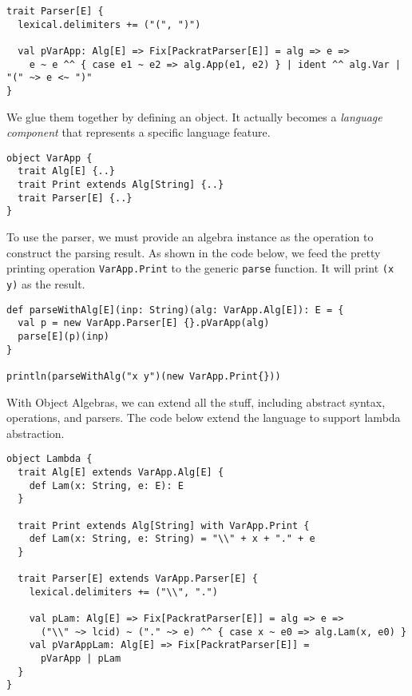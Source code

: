 \begin{lstlisting}
trait Parser[E] {
  lexical.delimiters += ("(", ")")

  val pVarApp: Alg[E] => Fix[PackratParser[E]] = alg => e =>
    e ~ e ^^ { case e1 ~ e2 => alg.App(e1, e2) } | ident ^^ alg.Var | "(" ~> e <~ ")"
}
\end{lstlisting}

We glue them together by defining an object. It actually becomes a \textit{language component} that represents a specific language feature.

\begin{lstlisting}
object VarApp {
  trait Alg[E] {..}
  trait Print extends Alg[String] {..}
  trait Parser[E] {..}
}
\end{lstlisting}

To use the parser, we must provide an algebra instance as the operation to construct the parsing result. As shown in the code below, we feed the pretty printing operation \lstinline{VarApp.Print} to the generic \lstinline{parse} function. It will print \lstinline{(x y)} as the result.

\begin{lstlisting}
def parseWithAlg[E](inp: String)(alg: VarApp.Alg[E]): E = {
  val p = new VarApp.Parser[E] {}.pVarApp(alg)
  parse[E](p)(inp)
}

println(parseWithAlg("x y")(new VarApp.Print{}))
\end{lstlisting}

With Object Algebras, we can extend all the stuff, including abstract syntax, operations, and parsers. The code below extend the language to support lambda abstraction.

\begin{lstlisting}
object Lambda {
  trait Alg[E] extends VarApp.Alg[E] {
    def Lam(x: String, e: E): E
  }

  trait Print extends Alg[String] with VarApp.Print {
    def Lam(x: String, e: String) = "\\" + x + "." + e
  }

  trait Parser[E] extends VarApp.Parser[E] {
    lexical.delimiters += ("\\", ".")

    val pLam: Alg[E] => Fix[PackratParser[E]] = alg => e =>
      ("\\" ~> lcid) ~ ("." ~> e) ^^ { case x ~ e0 => alg.Lam(x, e0) }
    val pVarAppLam: Alg[E] => Fix[PackratParser[E]] =
      pVarApp | pLam
  }
}
\end{lstlisting}

